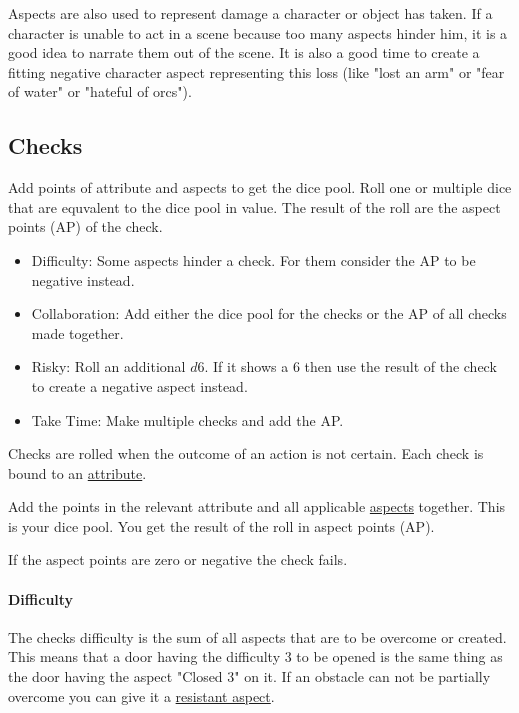 \documentclass[11pt]{article}
\begin{document}
{Aspects are also used to represent damage a character or object has taken. If a character is unable to act in a scene because too many aspects hinder him, it is a good idea to narrate them out of the scene. It is also a good time to create a fitting negative character aspect representing this loss (like "lost an arm" or "fear of water" or "hateful of orcs").


\subsection{Checks}
\label{sec:org12da81f}
\begin{short}
Add points of attribute and aspects to get the dice pool. Roll one or multiple dice that are equvalent to the dice pool in value. The result of the roll are the aspect points (AP) of the check.
\begin{itemize}
\item Difficulty: Some aspects hinder a check. For them consider the AP to be negative instead.
\item Collaboration: Add either the dice pool for the checks or the AP of all checks made together.
\item Risky: Roll an additional \(d6\). If it shows a \(6\) then use the result of the check to create a negative aspect instead.
\item Take Time: Make multiple checks and add the AP.
\end{itemize}
\end{short}

Checks are rolled when the outcome of an action is not certain. Each check is bound to an \hyperref[sec:orgb22a034]{attribute}.

Add the points in the relevant attribute and all applicable \hyperref[sec:org652ad55]{aspects} together. This is your dice pool. You get the result of the roll in aspect points (AP).

If the aspect points are zero or negative the check fails.

\paragraph*{Difficulty}
\label{sec:orgec754ba}
The checks difficulty is the sum of all aspects that are to be overcome or created. This means that a door having the difficulty 3 to be opened is the same thing as the door having the aspect "Closed 3" on it. If an obstacle can not be partially overcome you can give it a \hyperref[sec:org03d5237]{resistant aspect}.

}
\end{document}
